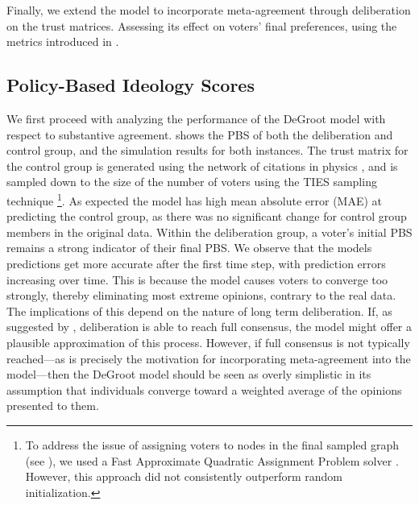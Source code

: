 \documentclass[11pt, oneside, dvipsnames]{Thesis} %
\begin{document}
Finally, we extend the model to incorporate meta-agreement through deliberation
on the trust matrices. Assessing its effect on voters’ final preferences, using
the metrics introduced in .

\subsection{Policy-Based Ideology Scores}

We first proceed with analyzing the performance of the DeGroot model with
respect to substantive agreement.  shows the PBS of both the
deliberation and control group, and the simulation results for both instances.
The trust matrix for the control group is generated using the network of
citations in physics \cite{nr}, and is sampled down to the size of the number
of voters using the TIES sampling technique
\cite{ahmedNetworkSamplingStatic2013}\footnote{To address the issue of
	assigning voters to nodes in the final sampled graph (see
	), we used a Fast Approximate Quadratic Assignment Problem
	solver \cite{vogelsteinFastApproximateQuadratic2015}. However, this
	approach did not consistently outperform random initialization.}. As
expected the model has high mean absolute error (MAE) at predicting the
control group, as there was no significant change for control group
members in the original data. Within the deliberation group, a voter's
initial PBS remains a strong indicator of their final PBS. We observe
that the models predictions get more accurate after the first time
step, with prediction errors increasing over time. This is because the
model causes voters to converge too strongly, thereby eliminating most
extreme opinions, contrary to the real data. The implications of this
depend on the nature of long term deliberation. If, as suggested by
\citet{elsterMarketForumThree2002}, deliberation is able to reach full
consensus, the model might offer a plausible approximation of this
process. However, if full consensus is not typically reached—as is
precisely the motivation for incorporating meta-agreement into the
model—then the DeGroot model should be seen as overly simplistic in its
assumption that individuals converge toward a weighted average of the
opinions presented to them.
\end{document}
